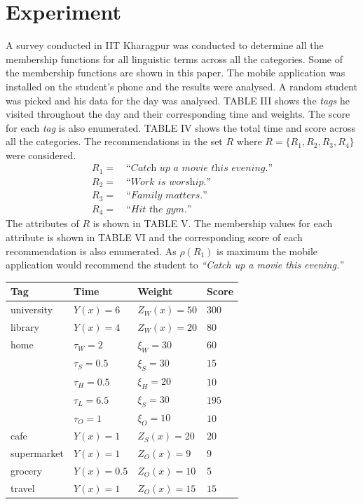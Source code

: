 \documentclass[conference]{IEEEtran}
\newcommand{\quotes}[1]{``#1''}
\begin{document}
\section{Experiment}
A survey conducted in IIT Kharagpur was conducted to determine all the membership functions for all linguistic terms across all the categories. Some of the membership functions are shown in this paper. The mobile application was installed on the student\rq s phone and the results were analysed. A random student was picked and his data for the day was analysed. TABLE III shows the \textit{tags} he visited throughout the day and their corresponding time and weights. The score for each \textit{tag} is also enumerated. TABLE IV shows the total time and score across all the categories. The recommendations in the set $R$ where $R = \{R_1, R_2, R_3, R_4\}$ were considered.
\begin{align*}
R_1 =\ &\textit{\quotes{Catch up a movie this evening.}}\\
R_2 =\ &\textit{\quotes{Work is worship.}}\\
R_3 =\ &\textit{\quotes{Family matters.}}\\
R_4 =\ &\textit{\quotes{Hit the gym.}}
\end{align*}
The attributes of $R$ is shown in TABLE V. The membership values for each attribute is shown in TABLE VI and the corresponding score of each recommendation is also enumerated. As $\rho(R_1)$ is maximum the mobile application would recommend the student to \textit{\quotes{Catch up a movie this evening.}}
\begin{table}
\small
{}
\begin{center}
\def\arraystretch{1.7}
\begin{tabular}{| l | l | l | l |}
\hline
\bf Tag & \bf Time & \bf Weight & \bf Score \\
\hline
university & $Y(x)=6$ & $Z_W(x) = 50$ & $300$ \\
\hline
library & $Y(x)=4$ & $Z_W(x) = 20$ & $80$ \\
\hline
home & $\tau_W=2$ & $\xi_W=30$ & $60$ \\
& $\tau_S=0.5$ & $\xi_S=30$ & $15$ \\
& $\tau_H=0.5$ & $\xi_H=20$ & $10$ \\
& $\tau_L=6.5$ & $\xi_S=30$ & $195$ \\
& $\tau_O=1$ & $\xi_O=10$ & $10$ \\
\hline
cafe & $Y(x)=1$ & $Z_S(x)=20$ & $20$ \\
\hline
supermarket & $Y(x)=1$ & $Z_O(x)=9$ & $9$ \\
\hline
grocery & $Y(x)=0.5$ & $Z_O(x)=10$ & $5$ \\
\hline
travel & $Y(x)=1$ & $Z_O(x)=15$ & $15$ \\
\hline
\end{tabular}
\end{center}
\end{table}
\end{document}
